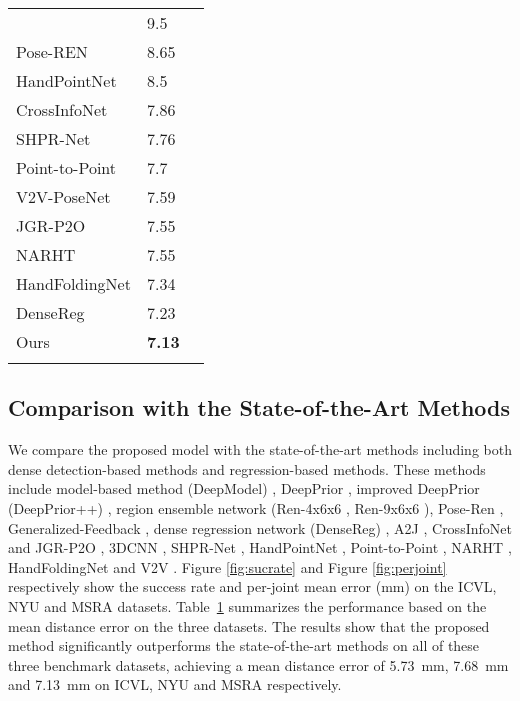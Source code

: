\documentclass{article}
\begin{document}
\begin{table}
\begin{tabularx}{\columnwidth}{lll}
{\begin{tabular}{cr}
  DeepPrior++ \cite{oberweger2017deepprior++}  &         9.5  \\
         Pose-REN \cite{chen2020pose}          &         8.65 \\
        HandPointNet \cite{ge2018hand}         &         8.5  \\
    CrossInfoNet \cite{du2019crossinfonet}     &         7.86 \\
         SHPR-Net \cite{chen2018shpr}          &         7.76 \\
       Point-to-Point \cite{ge2018point}       &         7.7  \\
        V2V-PoseNet \cite{moon2018v2v}         &         7.59 \\
          JGR-P2O \cite{fang2020jgr}           &         7.55 \\
          NARHT \cite{huang2020hand}           &         7.55 \\
 HandFoldingNet \cite{cheng2021handfoldingnet} &         7.34 \\
         DenseReg \cite{wan2018dense}          &         7.23 \\
          Ours                                 &        \textbf{7.13} \\

\hline
\end{tabular}
}
\end{tabularx}
\label{tab:comprehensive}
\end{table}

\subsection{Comparison with the State-of-the-Art Methods}
We compare the proposed model with the state-of-the-art methods including both dense detection-based methods and regression-based methods. These methods include model-based method (DeepModel) \cite{zhou2016model}, DeepPrior \cite{oberweger2015hands}, improved DeepPrior (DeepPrior++) \cite{oberweger2017deepprior++}, region ensemble network (Ren-4x6x6 \cite{guo2017region}, Ren-9x6x6 \cite{wang2018region}), Pose-Ren \cite{chen2020pose}, Generalized-Feedback \cite{oberweger2019generalized}, dense regression network (DenseReg) \cite{wan2018dense}, A2J \cite{xiong2019a2j}, CrossInfoNet \cite{du2019crossinfonet} and JGR-P2O \cite{fang2020jgr}, 3DCNN \cite{ge20173d}, SHPR-Net \cite{chen2018shpr}, HandPointNet \cite{ge2018hand}, Point-to-Point \cite{ge2018point}, NARHT \cite{huang2020hand}, HandFoldingNet \cite{cheng2021handfoldingnet} and V2V \cite{moon2018v2v}.
Figure \ref{fig:sucrate} and Figure \ref{fig:perjoint} respectively show the success rate and per-joint mean error (mm) on the ICVL, NYU and MSRA datasets. Table~\ref{tab:comprehensive} summarizes the performance based on the mean distance error on the three datasets. The results show that the proposed method significantly outperforms the state-of-the-art methods on all of these three benchmark datasets, achieving a mean distance error of 5.73~mm, 7.68~mm and 7.13~mm on ICVL, NYU and MSRA respectively. 
\end{document}
